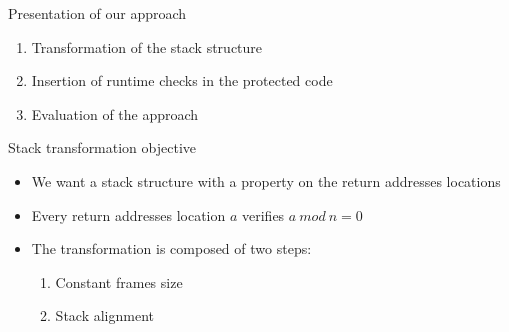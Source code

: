 \documentclass{beamer}
\begin{document}
\begin{frame}[c]{Presentation of our approach}
	\begin{enumerate}\itemsep16pt
		\item Transformation of the stack structure
		\item Insertion of runtime checks in the protected code
		\item Evaluation of the approach
	\end{enumerate}
\end{frame}


\begin{frame}[c]{Stack transformation objective}
	\begin{itemize}\itemsep16pt
		\item We want a stack structure with a property on the return addresses locations
		\item Every return addresses location \underline{$a$} verifies \underline{$a~mod~n=0$}
		\item The transformation is composed of two steps:
			\begin{enumerate}
				\item Constant frames size
				\item Stack alignment
			\end{enumerate}
	\end{itemize}
\end{frame}
\end{document}
